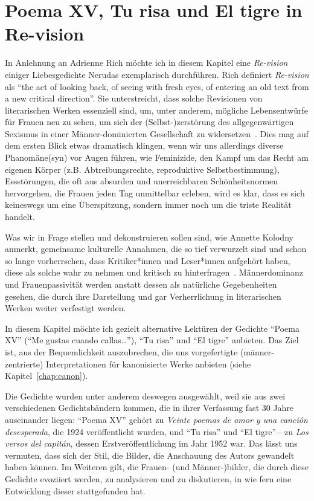 \section{Poema XV, Tu risa und El tigre in Re-vision}


In Anlehnung an Adrienne Rich möchte ich in diesem Kapitel eine \textit{Re-vision} einiger Liebesgedichte Nerudas exemplarisch durchführen.
Rich definiert \textit{Re-vision} als ``the act of looking back, of seeing with fresh eyes, of entering an old text from a new critical direction''.
Sie unterstreicht, dass solche Revisionen von literarischen Werken essenziell sind, um, unter anderem, mögliche Lebensentwürfe für Frauen neu zu sehen, um sich der (Selbst-)zerstörung des allgegenwärtigen Sexismus in einer Männer-dominierten Gesellschaft zu widersetzen~\cite{Rich1972}.
Dies mag auf dem ersten Blick etwas dramatisch klingen, wenn wir uns allerdings diverse Phanomäne(syn) vor Augen führen, wie Feminizide, den Kampf um das Recht am eigenen Körper (z.B. Abtreibungsrechte, reproduktive Selbstbestimmung), Essstörungen, die oft aus absurden und unerreichbaren Schönheitsnormen hervorgehen, die Frauen jeden Tag unmittelbar erleben, wird es klar, dass es sich keineswegs um eine Überspitzung, sondern immer noch um die triste Realität handelt.

Was wir in Frage stellen und dekonstruieren sollen sind, wie Annette Kolodny anmerkt, gemeinsame kulturelle Annahmen, die so tief verwurzelt sind und schon so lange vorherrschen, dass Kritiker*innen und Leser*innen aufgehört haben, diese als solche wahr zu nehmen und kritisch zu hinterfragen~\cite{Kolodny1980}.
Männerdominanz und Frauenpassivität werden anstatt dessen als natürliche Gegebenheiten gesehen, die durch ihre Darstellung und gar Verherrlichung in literarischen Werken weiter verfestigt werden.

In diesem Kapitel möchte ich gezielt alternative Lektüren der Gedichte ``Poema XV'' (``Me gustas cuando callas\ldots''), ``Tu risa'' und ``El tigre'' anbieten. 
Das Ziel ist, aus der Bequemlichkeit auszubrechen, die uns vorgefertigte (männer-zentrierte) Interpretationen für kanonisierte Werke anbieten (siehe Kapitel~\ref{chap:canon}).

Die Gedichte wurden unter anderem deswegen ausgewählt, weil sie aus zwei verschiedenen Gedichtsbändern kommen, die in ihrer Verfassung fast 30 Jahre auseinander liegen:
``Poema XV'' gehört zu \textit{Veinte poemas de amor y una canción desesperada}, die 1924 veröffentlicht wurden, und ``Tu risa'' und ``El tigre''—zu \textit{Los versos del capitán}, dessen Erstveröffentlichung im Jahr 1952 war.
Das lässt uns vermuten, dass sich der Stil, die Bilder, die Anschauung des Autors gewandelt haben können.
Im Weiteren gilt, die Frauen- (und Männer-)bilder, die durch diese Gedichte evoziiert werden, zu analysieren und zu diskutieren, in wie fern eine Entwicklung dieser stattgefunden hat.


